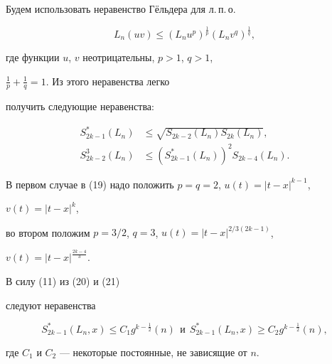 \begin{pf} 


Будем использовать неравенство Г\"ельдера для л.\,п.\,о. 


\begin{equation} 


L_n(u v)\le(L_n u^p)^{\frac{1}{p}} 


(L_n v^q)^{\frac{1}{q}}, 


\end{equation} 


где функции $u$, $v$ неотрицательны, $p>1$, $q>1$, 


$\frac{1}{p}+\frac{1}{q}=1$. Из этого неравенства легко 


получить следующие неравенства: 


\begin{align} 


S^*_{2k-1}(L_n)&\le\sqrt{S_{2k-2}(L_n)S_{2k}(L_n)}, \\ 


S^3_{2k-2}(L_n)&\le (S^*_{2k-1}(L_n))^2 


S_{2k-4}(L_n). 


\end{align} 


В первом случае в (19) надо положить $p=q=2$, $u(t)=|t-x|^{k-1}$, 


$v(t)=|t-x|^k$, 


во втором положим $p=3/2$, $q=3$, $u(t)=|t-x|^{2/3(2k-1)}$, 


$v(t)=|t-x|^{\frac{2k-4}{3}}$. 


В силу (11) из (20) и (21) 


следуют неравенства 


$$ 


S^*_{2k-1}(L_n,x)\le C_1 g^{k-\frac{1}{2}}(n)\ \ 


\text{и}\ \ S^*_{2k-1}(L_n,x)\ge C_2 


g^{k-\frac{1}{2}}(n), 


$$ 


где $C_1$ и $C_2$ --- некоторые постоянные, не зависящие от $n$. 


\end{pf} 


 


